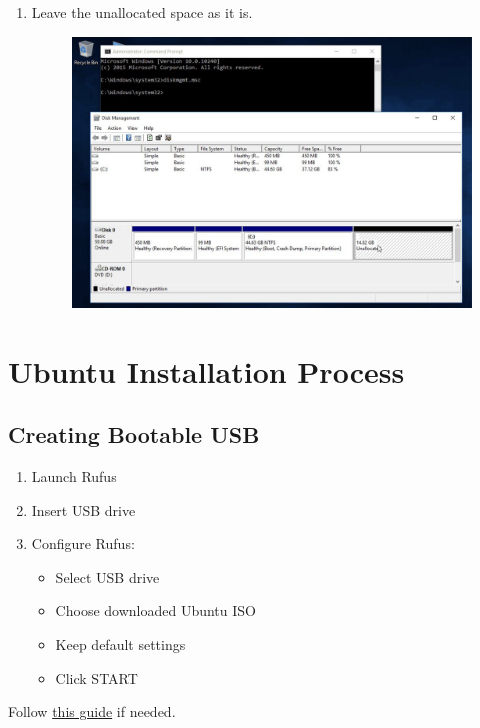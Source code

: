 \documentclass[11pt,a4paper]{article}
\begin{document}
\begin{enumerate}
    \item Leave the unallocated space as it is.
    \begin{figure}[htp]
        \centering
        \includegraphics[width=0.6\linewidth]{images/step3.png}
        \label{fig:enter-label}
    \end{figure}
\end{enumerate}

\section{Ubuntu Installation Process}
\subsection{Creating Bootable USB}
\begin{enumerate}
    \item Launch Rufus
    \item Insert USB drive
    \item Configure Rufus:
    \begin{itemize}
        \item Select USB drive
        \item Choose downloaded Ubuntu ISO
        \item Keep default settings
        \item Click START
    \end{itemize}
\end{enumerate}
 Follow \href{https://rufus.ie/en/}{this guide} if needed.
\end{document}
